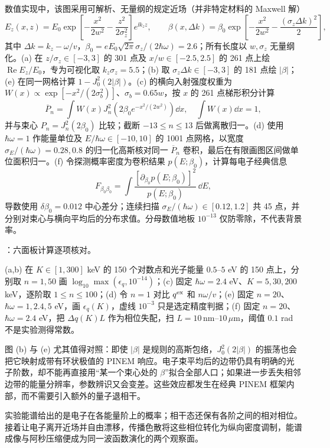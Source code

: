 数值实现中，该图采用可解析、无量纲的规定近场（并非特定材料的 Maxwell 解）
\[
E_z(x,z)=E_0\exp\!\left[-\frac{x^2}{2w^2}-\frac{z^2}{2\sigma_z^2}\right]e^{\ii k_z z},
\qquad
\beta(x,\Delta k)=\beta_0\exp\!\left[-\frac{x^2}{2w^2}-\frac{(\sigma_z\Delta k)^2}{2}\right],
\]
其中 $\Delta k=k_z-\omega/v$，$\beta_0=eE_0\sqrt{2\pi}\sigma_z/(2\hbar\omega)=2.6$；所有长度以 $w,\sigma_z$ 无量纲化。(a) 在 $z/\sigma_z\in[-3,3]$ 的 301 点及 $x/w\in[-2.5,2.5]$ 的 261 点上绘 $\operatorname{Re}E_z/E_0$，专为可视化取 $k_z\sigma_z=5.5$；(b) 取 $\sigma_z\Delta k\in[-3,3]$ 的 181 点绘 $|\beta|$；(e) 在同一网格计算 $1-J_0^2(2|\beta|)$。(c) 的横向入射强度权重为 $W(x)\propto\exp[-x^2/(2\sigma_b^2)]$、$\sigma_b=0.65w$，按 $x$ 的 261 点梯形积分计算
\[
\overline P_n=\int W(x)J_n^2\!\left(2\beta_0e^{-x^2/(2w^2)}\right)\dd x,
\quad \int W(x)\dd x=1,
\]
并与束心 $P_n=J_n^2(2\beta_0)$ 比较；截断 $-13\le n\le13$ 后做离散归一。(d) 使用 $\hbar\omega=1$ 作能量单位及 $E/\hbar\omega\in[-10,10]$ 的 1001 点网格，以宽度 $\sigma_E/(\hbar\omega)=0.28,0.8$ 的归一化高斯核对同一 $\overline P_n$ 卷积，最后在有限画图区间做单位面积归一。(f) 令探测概率密度为卷积结果 $p(E;\beta_0)$，计算每电子经典信息
\[
F_{\beta_0\beta_0}=\int\frac{[\partial_{\beta_0}p(E;\beta_0)]^2}{p(E;\beta_0)}\,\dd E,
\]
导数使用 $\delta\beta_0=0.012$ 中心差分；连续扫描 $\sigma_E/(\hbar\omega)\in[0.12,1.2]$ 共 45 点，并分别对束心与横向平均后的分布求值。分母数值地板 $10^{-13}$ 仅防零除，不代表背景率。


\noindent {}：六面板计算逐项核对。\par\noindent (a,b) 在 $K\in[1,300]$ keV 的 150 个对数点和光子能量 $0.5$--$5$ eV 的 150 点上，分别取 $n=1,50$ 画 $\log_{10}\max(\epsilon_q,10^{-14})$；(c) 固定 $\hbar\omega=2.4$ eV、$K=5,30,200$ keV，逐阶取 $1\le n\le100$；(d) 令 $n=1$ 对比 $q^{\rm ex}$ 和 $n\omega/v$；(e) 固定 $n=20$、$\hbar\omega=1,2.4,5$ eV，画 $\epsilon_q(K)$，虚线 $10^{-3}$ 只是选定精度判据；(f) 固定 $n=20$、$\hbar\omega=2.4$ eV，把 $\Delta q(K)L$ 作为相位失配，扫 $L=10\,\mathrm{nm}$--$10\,\mu\mathrm m$，阈值 $0.1$ rad 不是实验测得常数。


图 (b) 与 (e) 尤其值得对照：即使 $|\beta|$ 是规则的高斯包络，$J_0^2(2|\beta|)$ 的振荡也会把它映射成带有环状极值的 PINEM 响应。电子束平均后的边带仍具有明确的光子阶数，却不能再直接用“某一个束心处的 $\beta$”拟合全部人口；如果进一步丢失相邻边带的能量分辨率，参数辨识又会变差。这些效应都发生在经典 PINEM 框架内部，而不需要引入额外的量子退相干。
\clearpage


\par\medskip
实验能谱给出的是电子在各能量阶上的概率；相干态还保有各阶之间的相对相位。接着让电子离开近场并自由漂移，传播色散将这些相位转化为纵向密度调制，能谱成像与阿秒压缩便成为同一波函数演化的两个观察面。
